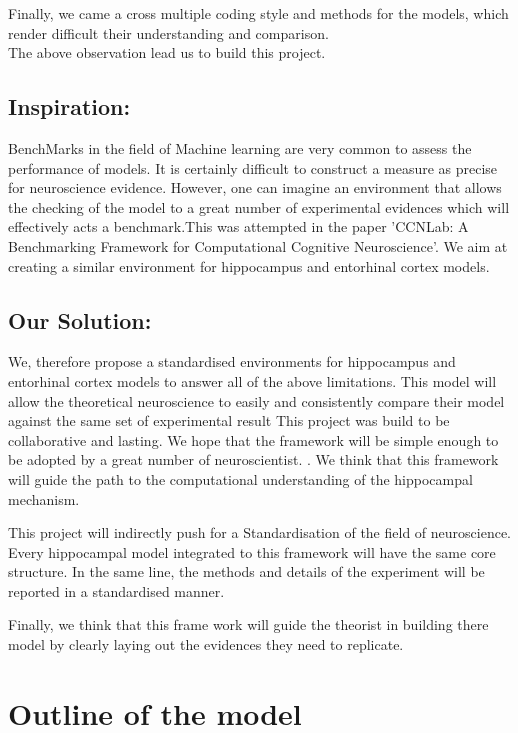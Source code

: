 \documentclass{article}
\begin{document}
Finally, we came a cross multiple coding style and methods for the models, which render difficult their understanding and comparison. \\

The above observation lead us to build this project.


\subsection{Inspiration:}

BenchMarks in the field of Machine learning are very common to assess the performance of models. It is certainly difficult to construct a measure as precise for neuroscience evidence. However, one can imagine an environment that allows the checking of the model to a great number of experimental evidences which will effectively acts a benchmark.This was attempted in the paper 'CCNLab: A Benchmarking Framework for Computational Cognitive Neuroscience'. We aim at creating a similar environment for hippocampus and entorhinal cortex models.

\subsection{Our Solution:}

We, therefore propose a standardised environments for hippocampus and entorhinal cortex models to answer all of the above limitations.
This model will allow the theoretical neuroscience to easily and consistently compare their model against the same set of experimental result This project was build to be collaborative and lasting. We hope that the framework will be simple enough to be adopted by a great number of neuroscientist. . We think that this framework will guide the path to the computational understanding of the hippocampal mechanism.

 This project will indirectly  push for a Standardisation of the field of neuroscience. Every hippocampal model integrated to this framework will have the same core structure.
In the same line, the methods and details of the experiment will be reported in a standardised manner. 

Finally, we think that this frame work will guide the theorist in building there model by clearly laying out the evidences they need to replicate. 




\section{Outline of the model}
\end{document}
